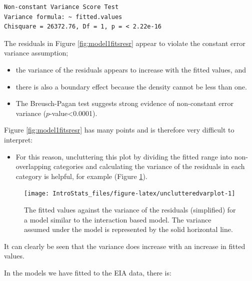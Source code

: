 \documentclass[
  oneside]{krantz}
\providecommand{\tightlist}{%
  \setlength{\itemsep}{0pt}\setlength{\parskip}{0pt}}
\begin{document}
\begin{verbatim}
Non-constant Variance Score Test 
Variance formula: ~ fitted.values 
Chisquare = 26372.76, Df = 1, p = < 2.22e-16
\end{verbatim}

The residuals in Figure \ref{fig:model1fitsresr} appear to violate the constant error variance assumption;

\begin{itemize}
\tightlist
\item
  the variance of the residuals appears to increase with the fitted values, and
\item
  there is also a boundary effect because the density cannot be less than one.
\item
  The Breusch-Pagan test suggests strong evidence of non-constant error variance (\(p\)-value\textless0.0001).
\end{itemize}

Figure \ref{fig:model1fitsresr} has many points and is therefore very difficult to interpret:

\begin{itemize}
\tightlist
\item
  For this reason, uncluttering this plot by dividing the fitted range into non-overlapping categories and calculating the variance of the residuals in each category is helpful, for example (Figure \ref{fig:unclutteredvarplot}).
\end{itemize}

\begin{figure}

{\centering \texttt{[image: IntroStats\_files/figure-latex/unclutteredvarplot-1]} 

}

\caption{The fitted values against the variance of the residuals (simplified) for a model similar to the interaction based model. The variance assumed under the model is represented by the solid horizontal line.}\label{fig:unclutteredvarplot}
\end{figure}

It can clearly be seen that the variance does increase with an increase in fitted values.

In the models we have fitted to the EIA data, there is:
\end{document}
